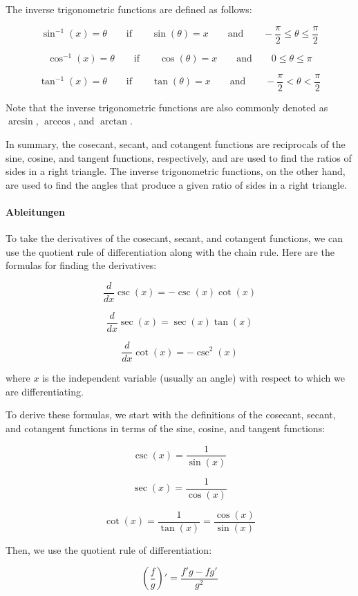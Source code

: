 \documentclass{book}
\begin{document}
The inverse trigonometric functions are defined as follows:

$$\sin^{-1}(x) = \theta \qquad \text{if} \qquad \sin(\theta) = x \qquad \text{and} \qquad -\frac{\pi}{2} \leq \theta \leq \frac{\pi}{2}$$

$$\cos^{-1}(x) = \theta \qquad \text{if} \qquad \cos(\theta) = x \qquad \text{and} \qquad 0 \leq \theta \leq \pi$$

$$\tan^{-1}(x) = \theta \qquad \text{if} \qquad \tan(\theta) = x \qquad \text{and} \qquad -\frac{\pi}{2} < \theta < \frac{\pi}{2}$$

Note that the inverse trigonometric functions are also commonly denoted as
$\arcsin$, $\arccos$, and $\arctan$.

In summary, the cosecant, secant, and cotangent functions are reciprocals of
the sine, cosine, and tangent functions, respectively, and are used to find the
ratios of sides in a right triangle. The inverse trigonometric functions, on
the other hand, are used to find the angles that produce a given ratio of sides
in a right triangle.



\paragraph{Ableitungen} %
\label{par:Ableitungen}
To take the derivatives of the cosecant, secant, and cotangent functions, we
can use the quotient rule of differentiation along with the chain rule. Here
are the formulas for finding the derivatives:

$$\frac{d}{dx} \csc(x) = -\csc(x) \cot(x)$$

$$\frac{d}{dx} \sec(x) = \sec(x) \tan(x)$$

$$\frac{d}{dx} \cot(x) = -\csc^2(x)$$

where $x$ is the independent variable (usually an angle) with respect to which
we are differentiating.

To derive these formulas, we start with the definitions of the cosecant,
secant, and cotangent functions in terms of the sine, cosine, and tangent
functions:

$$\csc(x) = \frac{1}{\sin(x)}$$

$$\sec(x) = \frac{1}{\cos(x)}$$

$$\cot(x) = \frac{1}{\tan(x)} = \frac{\cos(x)}{\sin(x)}$$

Then, we use the quotient rule of differentiation:

$$\left(\frac{f}{g}\right)' = \frac{f'g - fg'}{g^2}$$
\end{document}
